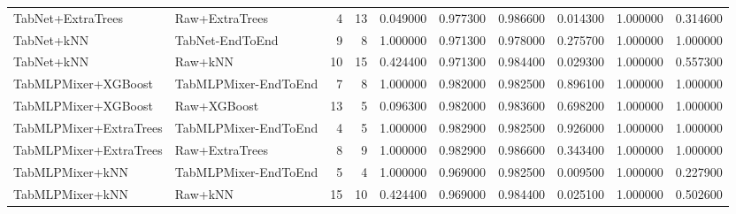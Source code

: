 \begin{table}
\begin{tabular}{llrrrrrrrr}
TabNet+ExtraTrees & Raw+ExtraTrees & 4 & 13 & 0.049000 & 0.977300 & 0.986600 & 0.014300 & 1.000000 & 0.314600 \\
TabNet+kNN & TabNet-EndToEnd & 9 & 8 & 1.000000 & 0.971300 & 0.978000 & 0.275700 & 1.000000 & 1.000000 \\
TabNet+kNN & Raw+kNN & 10 & 15 & 0.424400 & 0.971300 & 0.984400 & 0.029300 & 1.000000 & 0.557300 \\
TabMLPMixer+XGBoost & TabMLPMixer-EndToEnd & 7 & 8 & 1.000000 & 0.982000 & 0.982500 & 0.896100 & 1.000000 & 1.000000 \\
TabMLPMixer+XGBoost & Raw+XGBoost & 13 & 5 & 0.096300 & 0.982000 & 0.983600 & 0.698200 & 1.000000 & 1.000000 \\
TabMLPMixer+ExtraTrees & TabMLPMixer-EndToEnd & 4 & 5 & 1.000000 & 0.982900 & 0.982500 & 0.926000 & 1.000000 & 1.000000 \\
TabMLPMixer+ExtraTrees & Raw+ExtraTrees & 8 & 9 & 1.000000 & 0.982900 & 0.986600 & 0.343400 & 1.000000 & 1.000000 \\
TabMLPMixer+kNN & TabMLPMixer-EndToEnd & 5 & 4 & 1.000000 & 0.969000 & 0.982500 & 0.009500 & 1.000000 & 0.227900 \\
TabMLPMixer+kNN & Raw+kNN & 15 & 10 & 0.424400 & 0.969000 & 0.984400 & 0.025100 & 1.000000 & 0.502600 \\
\bottomrule
\end{tabular}
\end{table}
